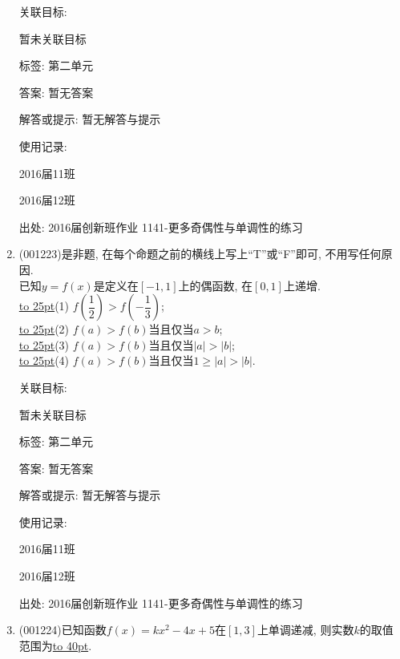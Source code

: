 \documentclass[10pt,a4paper]{article}
\newcommand{\blank}[1]{\underline{\hbox to #1pt{}}}
\begin{document}
\begin{enumerate}[1.]
关联目标:

暂未关联目标



标签: 第二单元

答案: 暂无答案

解答或提示: 暂无解答与提示

使用记录:

2016届11班					

2016届12班					


出处: 2016届创新班作业	1141-更多奇偶性与单调性的练习
\item { (001223)}是非题, 在每个命题之前的横线上写上``T''或``F''即可, 不用写任何原因.\\ 
已知$y=f(x)$是定义在$[-1,1]$上的偶函数, 在$[0,1]$上递增.\\ 
\blank{25}(1) $f(\dfrac{1}{2})>f(-\dfrac{1}{3})$;\\ 
\blank{25}(2) $f(a)>f(b)$当且仅当$a>b$;\\ 
\blank{25}(3) $f(a)>f(b)$当且仅当$|a|>|b|$;\\ 
\blank{25}(4) $f(a)>f(b)$当且仅当$1\ge |a|>|b|$.


关联目标:

暂未关联目标



标签: 第二单元

答案: 暂无答案

解答或提示: 暂无解答与提示

使用记录:

2016届11班				

2016届12班				


出处: 2016届创新班作业	1141-更多奇偶性与单调性的练习
\item { (001224)}已知函数$f(x)=kx^2-4x+5$在$[1,3]$上单调递减, 则实数$k$的取值范围为\blank{40}.



\end{enumerate}
\end{document}

